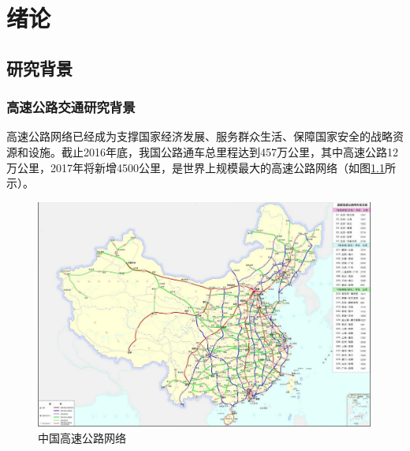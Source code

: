 
\chapter{绪论}
\section{研究背景}
\subsection{高速公路交通研究背景}

高速公路网络已经成为支撑国家经济发展、服务群众生活、保障国家安全的战略资源和设施。截止2016年底，我国公路通车总里程达到457万公里，其中高速公路12万公里，2017年将新增4500公里，是世界上规模最大的高速公路网络（如图\ref{gaosugonglu}所示）。 

				\begin{figure}[h]
				\centering
						\begin{minipage}{0.8\linewidth}
							\centering
							\includegraphics[width=4.4in]{picture/gaosugonglu}
							\caption{中国高速公路网络}
							\label{gaosugonglu}
						\end{minipage}%
				\end{figure}

